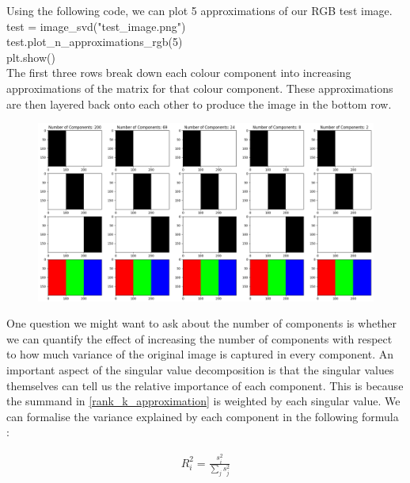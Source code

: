 \documentclass[a4paper,12pt]{article}
\newenvironment{code}{\ttfamily\\}{\\}
\newenvironment{scode}{\vspace{10pt} \begin{code}}{\vspace{10pt} \end{code}}
\begin{document}
	Using the following code, we can plot 5 approximations of our RGB test image. 
	\begin{scode}
		test = image\_svd("test\_image.png") \\
		test.plot\_n\_approximations\_rgb(5) \\
		plt.show()
	\end{scode}
	The first three rows break down each colour component into increasing approximations of the matrix for that colour component. These approximations are then layered back onto each other to produce the image in the bottom row. 
	\begin{figure}[h]
		\centering
		\includegraphics*[width = 13cm]{test_image_5_components_rgb.png}
	\end{figure}
	
	One question we might want to ask about the number of components is whether we can quantify the effect of increasing the number of components with respect to how much variance of the original image is captured in every component. An important aspect of the singular value decomposition is that the singular values themselves can tell us the relative importance of each component. This is because the summand in \ref{rank_k_approximation} is weighted by each singular value. We can formalise the variance explained by each component in the following formula \cite[page 131]{mml_book}:
	
	\begin{align}
		R^2_i = \frac{s_i^2}{\sum_{j}^{} s_j^2}
	\end{align}
	
\end{document}
